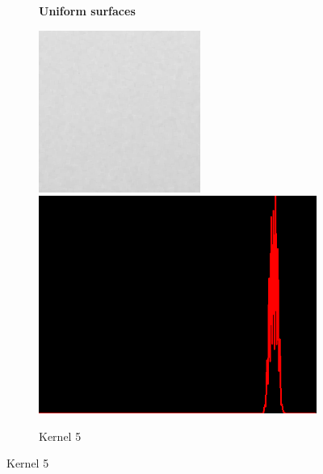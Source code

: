 \begin{figure}[H]
\begin{subfigure}[b]{0.28\textwidth}
        \begin{center}
        	\textbf{Uniform surfaces}
        \end{center}
        \includegraphics[width=\textwidth]{img3/rect_5_midpoint_5_final_img3.png}\\[0.1cm]
        \includegraphics[width=\textwidth]{img3/hist_rect_5_midpoint_5_final_img3.png}
        \caption{Kernel 5}
        \label{fig:img3_kernel_5_final}

\end{subfigure}
\end{figure}

